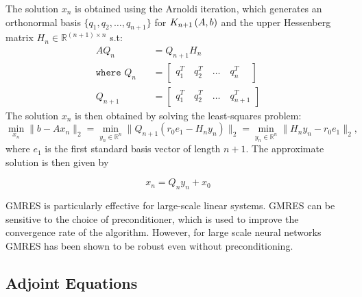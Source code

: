 The solution $x_n$ is obtained using the Arnoldi iteration, which generates an orthonormal basis $\{q_1, q_2, \dots, q_{n+1}\}$ for $K_{n+1}\left(A, b\right)$ and the upper Hessenberg matrix $H_n \in \mathbb{R}^{(n+1) \times n}$ s.t:
%
\begin{align}
  AQ_n                                & = Q_{n+1} H_n                                                      \\
  \texttt{where } Q_{n\phantom{ + 1}} & = \begin{bmatrix}
                                            q_1^T \quad q_2^T \quad \dots \quad q_{n\phantom{+ 1}}^T
                                          \end{bmatrix} \\
  Q_{n + 1}                           & = \begin{bmatrix}
                                            q_1^T \quad q_2^T \quad \dots \quad q_{n + 1}^T
                                          \end{bmatrix}
\end{align}
%
The solution $x_n$ is then obtained by solving the least-squares problem:
%
\begin{equation}
  \min_{x_n} \|b - Ax_n\|_2 = \min_{y_n \in \mathbb{R}^n} \| Q_{n + 1} \left( r_0 e_1 - H_n y_n \right) \|_2 = \min_{y_n \in \mathbb{R}^n} \| H_n y_n - r_0 e_1 \|_2,
\end{equation}
%
where $e_1$ is the first standard basis vector of length $n + 1$. The approximate solution is then given by

\begin{equation}
  x_n = Q_n y_n + x_0
\end{equation}

GMRES is particularly effective for large-scale linear systems. GMRES can be sensitive to the choice of preconditioner, which is used to improve the convergence rate of the algorithm. However, for large scale neural networks~\citep{pal2022mixing} GMRES has been shown to be robust even without preconditioning.


\subsection{Adjoint Equations}
\label{subsec:adjoint_equations_deqs}

